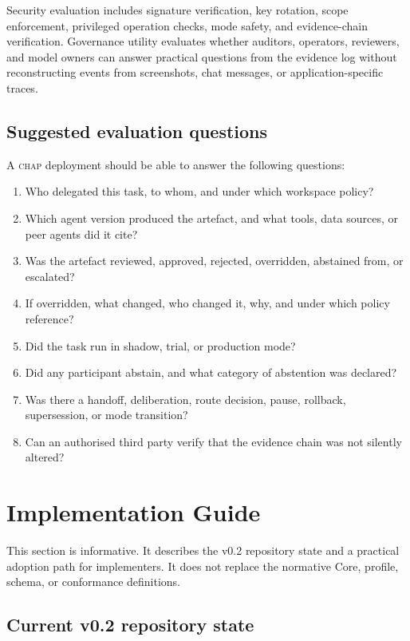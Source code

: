 \documentclass[11pt]{article}
\newcommand{\chap}{\textsc{chap}}
\begin{document}
Security evaluation includes signature verification, key rotation, scope enforcement, privileged operation checks, mode safety, and evidence-chain verification. Governance utility evaluates whether auditors, operators, reviewers, and model owners can answer practical questions from the evidence log without reconstructing events from screenshots, chat messages, or application-specific traces.

\subsection{Suggested evaluation questions}

A \chap{} deployment should be able to answer the following questions:

\begin{enumerate}[leftmargin=*]
    \item Who delegated this task, to whom, and under which workspace policy?
    \item Which agent version produced the artefact, and what tools, data sources, or peer agents did it cite?
    \item Was the artefact reviewed, approved, rejected, overridden, abstained from, or escalated?
    \item If overridden, what changed, who changed it, why, and under which policy reference?
    \item Did the task run in shadow, trial, or production mode?
    \item Did any participant abstain, and what category of abstention was declared?
    \item Was there a handoff, deliberation, route decision, pause, rollback, supersession, or mode transition?
    \item Can an authorised third party verify that the evidence chain was not silently altered?
\end{enumerate}

\section{Implementation Guide}
\label{sec:implementation}

This section is informative. It describes the v0.2 repository state and a practical adoption path for implementers. It does not replace the normative Core, profile, schema, or conformance definitions.

\subsection{Current v0.2 repository state}
\end{document}
